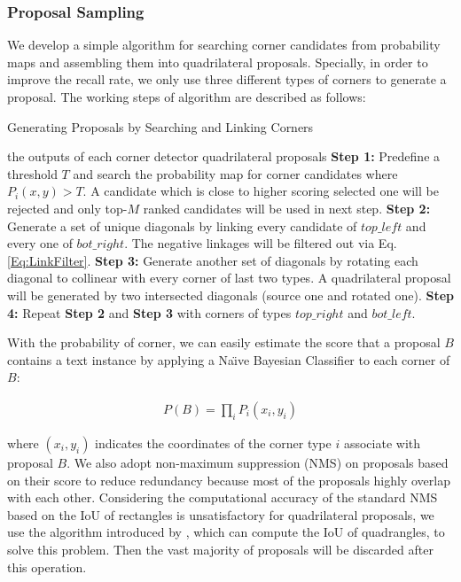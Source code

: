 \documentclass[3p, times]{elsarticle}
\begin{document}
\subsubsection{Proposal Sampling}
We develop a simple algorithm for searching corner candidates from probability maps and assembling them into quadrilateral proposals. Specially, in order to improve the recall rate, we only use three different types of corners to generate a proposal. The working steps of algorithm are described as follows:


\begin{algorithm}
	\renewcommand{\algorithmicrequire}{\textbf{Input:}}
	\renewcommand{\algorithmicensure}{\textbf{Output:}}
	\caption{Generating Proposals by Searching and Linking Corners}
	\label{Alg_1}
	\begin{algorithmic}
		\REQUIRE the outputs of each corner detector
		\ENSURE quadrilateral proposals
		\STATE \textbf{Step 1:} Predefine a threshold $T$ and search the probability map for corner candidates where $P_i(x,y) > T$. A candidate which is close to higher scoring selected one will be rejected and only top-$M$ ranked candidates will be used in next step. 
		\STATE \textbf{Step 2:} Generate a set of unique diagonals by linking every candidate of $top\_left$ and every one of $bot\_right$. The negative linkages will be filtered out via Eq.\ref{Eq:LinkFilter}. 
		\STATE \textbf{Step 3:} Generate another set of diagonals by rotating each diagonal to collinear with every corner of last two types. A quadrilateral proposal will be generated by two intersected diagonals (source one and rotated one). 
		\STATE \textbf{Step 4:} Repeat \textbf{Step 2} and \textbf{Step 3} with corners of types $top\_right$ and $bot\_left$.
	\end{algorithmic}  
\end{algorithm}




With the probability of corner, we can easily estimate the score that a proposal $B$ contains a text instance by applying a Na{\"\i}ve Bayesian Classifier to each corner of $B$:

\begin{gather}
P(B)=\prod_{i}P_i(x_i,y_i)
\label{Eq:BoxScore}
\end{gather}

\noindent where $(x_i,y_i)$ indicates the coordinates of the corner type $i$ associate with proposal $B$. We also adopt non-maximum suppression (NMS) on proposals based on their score to reduce redundancy because most of the proposals highly overlap with each other. Considering the computational accuracy of the standard NMS based on the IoU of rectangles is unsatisfactory for quadrilateral proposals, we use the algorithm introduced by \cite{RRPN2017ARXIV}, which can compute the IoU of quadrangles, to solve this problem. Then the vast majority of proposals will be discarded after this operation. 
\end{document}
